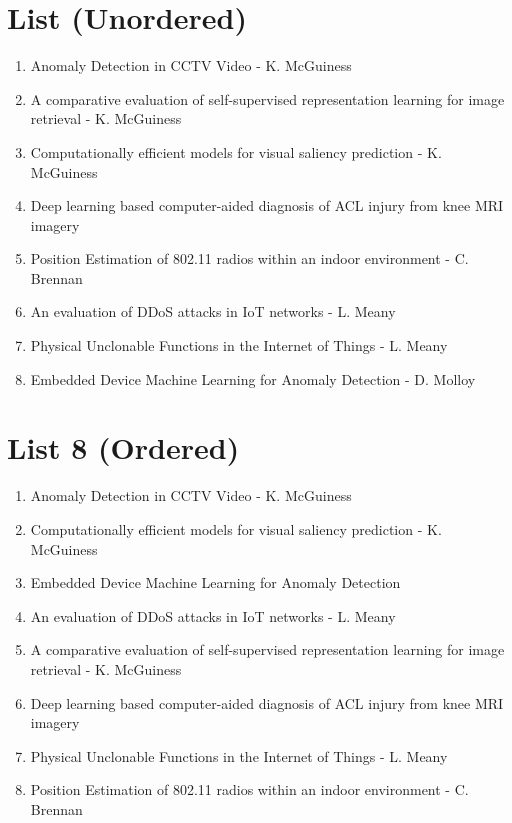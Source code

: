 \documentclass[a4paper]{article}
\begin{document}
\section{List (Unordered)}
\begin{enumerate}
	\item Anomaly Detection in CCTV Video - K. McGuiness
	\item A comparative evaluation of self-supervised representation
		learning for image retrieval - K. McGuiness
	\item Computationally efficient models for visual saliency prediction -
		K. McGuiness
	\item Deep learning based computer-aided diagnosis of ACL injury from
		knee MRI imagery
	\item Position Estimation of 802.11 radios within an indoor environment
		- C. Brennan
	\item An evaluation of DDoS attacks in IoT networks - L. Meany
	\item Physical Unclonable Functions in the Internet of Things - L. Meany
	\item Embedded Device Machine Learning for Anomaly Detection - D. Molloy
\end{enumerate}

\section{List 8 (Ordered)}
\begin{enumerate}
	\item Anomaly Detection in CCTV Video - K. McGuiness
	\item Computationally efficient models for visual saliency prediction -
		K. McGuiness
	\item Embedded Device Machine Learning for Anomaly Detection
	\item An evaluation of DDoS attacks in IoT networks - L. Meany
	\item A comparative evaluation of self-supervised representation
		learning for image retrieval - K. McGuiness
	\item Deep learning based computer-aided diagnosis of ACL injury from
		knee MRI imagery
	\item Physical Unclonable Functions in the Internet of Things - L. Meany
	\item Position Estimation of 802.11 radios within an indoor environment
		- C. Brennan
\end{enumerate}
\end{document}
